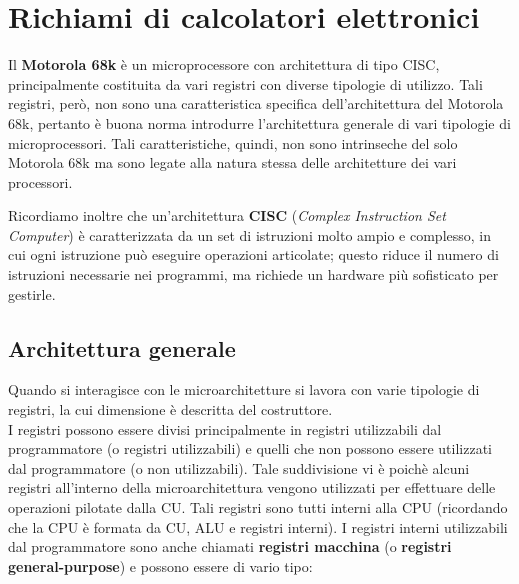  \section{Richiami di calcolatori elettronici}
Il \textbf{Motorola 68k} è un microprocessore con architettura di tipo CISC, principalmente costituita da vari registri con diverse tipologie di utilizzo. Tali registri, però, non sono una caratteristica specifica dell'architettura del Motorola 68k, pertanto è buona norma introdurre l'architettura generale di vari tipologie di microprocessori. Tali caratteristiche, quindi, non sono intrinseche del solo Motorola 68k ma sono legate alla natura stessa delle architetture dei vari processori.

Ricordiamo inoltre che un’architettura \textbf{CISC} (\textit{Complex Instruction Set Computer}) è caratterizzata da un set di istruzioni molto ampio e complesso, in cui ogni istruzione può eseguire operazioni articolate; questo riduce il numero di istruzioni necessarie nei programmi, ma richiede un hardware più sofisticato per gestirle.

\subsection{Architettura generale}
Quando si interagisce con le microarchitetture si lavora con varie tipologie di registri, la cui dimensione è descritta del costruttore. \\
I registri possono essere divisi principalmente in registri utilizzabili dal programmatore (o registri utilizzabili) e quelli che non possono essere utilizzati dal programmatore (o non utilizzabili). Tale suddivisione vi è poichè alcuni registri all'interno della microarchitettura vengono utilizzati per effettuare delle operazioni pilotate dalla CU. Tali registri sono tutti interni alla CPU (ricordando che la CPU è formata da CU, ALU e registri interni). I registri interni utilizzabili dal programmatore sono anche chiamati \textbf{registri macchina} (o \textbf{registri general-purpose}) e possono essere di vario tipo:

